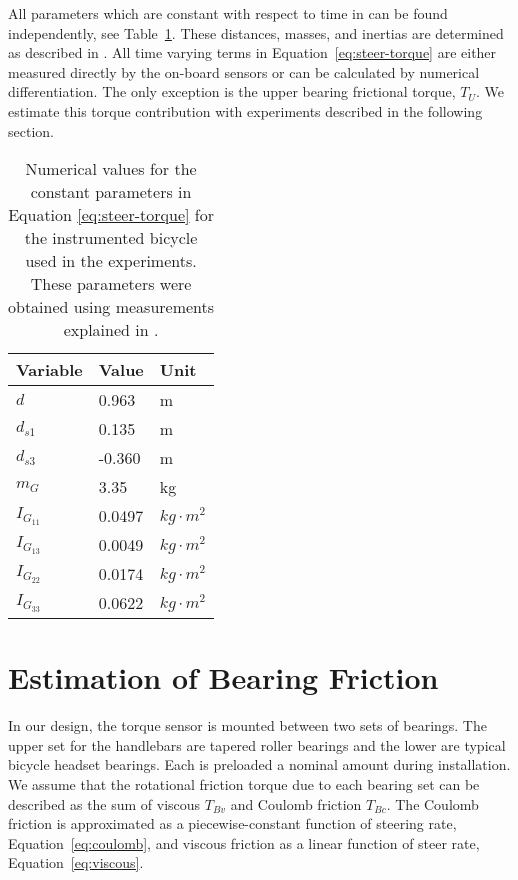 \documentclass[10pt]{article}
\begin{document}
All parameters which are constant with respect to time in can be
found independently, see Table~\ref{tab:numerical-constants}.
These distances, masses, and inertias are determined as described in
\cite{Moore2012}. All time varying terms in Equation~\ref{eq:steer-torque} are
either measured directly by the on-board sensors or can be calculated by
numerical differentiation. The only exception is the upper bearing frictional
torque, $T_U$. We estimate this torque contribution with experiments
described in the following section.

\begin{table}
  \centering
  \caption{Numerical values for the constant parameters in Equation
    \ref{eq:steer-torque} for the instrumented bicycle used in the experiments.
    These parameters were obtained using measurements explained in
    \cite{Moore2012}.}
  \begin{tabular}{lll}
    \toprule
    Variable     & Value  & Unit \\
    \midrule
    $d$          & 0.963  & m\\
    $d_{s1}$     & 0.135  & m \\
    $d_{s3}$     & -0.360 & m \\
    $m_G$        & 3.35   & kg \\
    $I_{G_{11}}$ & 0.0497 & $kg \cdot m^2$ \\
    $I_{G_{13}}$ & 0.0049 & $kg \cdot m^2$ \\
    $I_{G_{22}}$ & 0.0174 & $kg \cdot m^2$ \\
    $I_{G_{33}}$ & 0.0622 & $kg \cdot m^2$ \\
    \bottomrule
  \end{tabular}
  \label{tab:numerical-constants}
\end{table}

\section*{Estimation of Bearing Friction}
\label{sec:bearing-friction}

In our design, the torque sensor is mounted between two sets of bearings. The
upper set for the handlebars are tapered roller bearings and the lower are
typical bicycle headset bearings. Each is preloaded a nominal amount during
installation. We assume that the rotational friction torque due to each bearing set can be
described as the sum of viscous $T_{Bv}$ and Coulomb friction $T_{Bc}$. The
Coulomb friction is approximated as a piecewise-constant function of
steering rate, Equation~\ref{eq:coulomb}, and viscous friction as a linear
function of steer rate, Equation~\ref{eq:viscous}.
\end{document}
